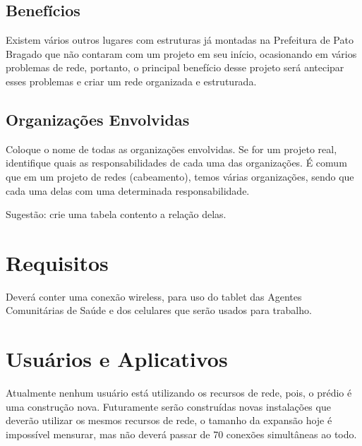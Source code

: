 \documentclass[	DIV=calc,%
							paper=a4,%
							fontsize=12pt,%
							onecolumn]{scrartcl}	 					%
\begin{document}
\subsection{Benefícios}
Existem vários outros lugares com estruturas já montadas na Prefeitura de Pato Bragado que não contaram com um projeto em seu início, ocasionando em vários problemas de rede, portanto, o principal benefício desse projeto será antecipar esses problemas e criar um rede organizada e estruturada.

\subsection{Organizações Envolvidas}
Coloque o nome de todas as organizações envolvidas. Se for um projeto real, identifique quais as responsabilidades de cada uma das organizações. É comum que em um projeto de redes (cabeamento), temos várias organizações, sendo que cada uma delas com uma determinada responsabilidade.

Sugestão: crie uma tabela contento a relação delas.





\section{Requisitos}
Deverá conter uma conexão wireless, para uso do tablet das Agentes Comunitárias de Saúde e dos celulares que serão usados para trabalho. 

\section{Usuários e Aplicativos}
Atualmente nenhum usuário está utilizando os recursos de rede, pois, o prédio é uma construção nova. Futuramente serão construídas novas instalações que deverão utilizar os mesmos recursos de rede, o tamanho da expansão hoje é impossível mensurar, mas não deverá passar de 70 conexões simultâneas ao todo.
 
\end{document}
